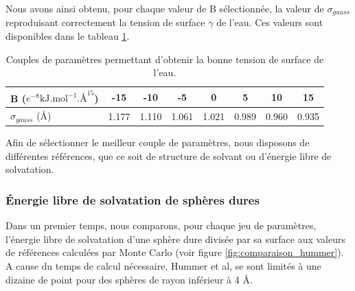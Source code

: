 Nous avons ainsi obtenu, pour chaque valeur de B sélectionnée, la valeur de $\sigma_{gauss}$ reproduisant correctement la tension de surface $\gamma$ de l'eau. Ces valeurs sont disponibles dans le tableau \ref{tab:parametres_bridge}.

\begin{table}[H]
 \centering
  \begin{tabular}{l || c c c c c c c}
    \hline
    B ($e^{-8} \mathrm{kJ.mol}^{-1}.\text{\AA}^{15}$)  & -15 & -10 & -5 & 0 & 5 & 10 & 15  \\
    \hline
     $\sigma_{gauss}$ (\AA)  & 1.177 & 1.110 & 1.061 & 1.021 & 0.989 & 0.960 & 0.935  \\
    \hline
  \end{tabular}
  \caption{Couples de paramètres permettant d'obtenir la bonne tension de surface de l'eau.}
  \label{tab:parametres_bridge}  
\end{table}

Afin de sélectionner le meilleur couple de paramètres, nous disposons de différentes références, que ce soit de structure de solvant ou d'énergie libre de solvatation. 


\subsubsection{\'Energie libre de solvatation de sphères dures}
Dans un premier temps, nous comparons, pour chaque jeu de paramètres, l'\'energie libre de solvatation d'une sphère dure divisée par sa surface aux valeurs de références calculées par Monte Carlo\cite{hummer_information_1996} (voir figure \ref{fig:comparaison_hummer}). A cause du temps de calcul nécessaire, Hummer et al\cite{hummer_information_1996}, se sont limités à une dizaine de point pour des sphères de rayon inférieur à 4 \AA.




